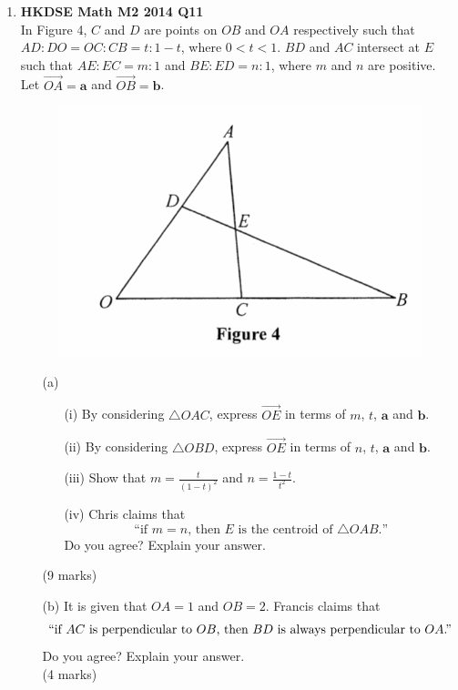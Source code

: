 \documentclass{report}
\begin{document}
\begin{enumerate}
\begin{enumerate}
\begin{figure}[H]
		\end{figure}
		\begin{enumerate}
			\item [(i)]When $CK = 160$ cm, the rate of change of $\theta$ is $-0.1$ rad s$^{-1}$. Find the rate of change of $x$ at this moment, \\correct to 4 significant figures. 
			\item [(ii)]Thomas claims that $K$ is moving towards $E$ at a speed faster than the horizontal speed $H$ is leaving the wall. Do you agree? Explain your answer.
		\end{enumerate}
		(6 marks)
	\end{enumerate}

	\newpage

	\item \textbf{HKDSE Math M2 2014 Q11}\\
	In Figure 4, $C$ and $D$ are points on $OB$ and $OA$ respectively such that $AD : DO = OC : CB = t : 1-t$, where $0 < t < 1$. $BD$ and $AC$ intersect at $E$ such that $AE : EC = m : 1 $ and $BE : ED = n : 1 $, where $m$ and $n$ are positive. Let $\overrightarrow{OA} = \textbf{a}$ and $\overrightarrow{OB} = \textbf{b}$. 
	\begin{figure}[H]
		\centering
		\includegraphics[width = .5\linewidth]{2014Figure4}
	\end{figure}
	\begin{enumerate}
		\item [(a)]
		\begin{enumerate}
			\item [(i)]By considering $\triangle OAC$, express $\overrightarrow{OE}$ in terms of $m$, $t$, $\textbf{a}$ and $\textbf{b}$.
			\item [(ii)]By considering $\triangle OBD$, express $\overrightarrow{OE}$ in terms of $n$, $t$, $\textbf{a}$ and $\textbf{b}$.
			\item [(iii)]Show that $\displaystyle m = \frac{t}{(1-t)^2}$ and $\displaystyle n = \frac{1-t}{t^2}$. 
			\item [(iv)]Chris claims that 
				$$\text{``if }m = n\text{, then }E\text{ is the centroid of }\triangle OAB\text{.''}$$
				Do you agree? Explain your answer.
		\end{enumerate}
		(9 marks)
		\item [(b)]It is given that $OA = 1$ and $OB = 2$. Francis claims that 
			$$``\text{if }AC\text{ is perpendicular to }OB\text{, then }BD\text{ is always perpendicular to }OA\text{.''}$$
			Do you agree? Explain your answer. \\(4 marks)
	\end{enumerate}


\end{enumerate}
\end{document}
